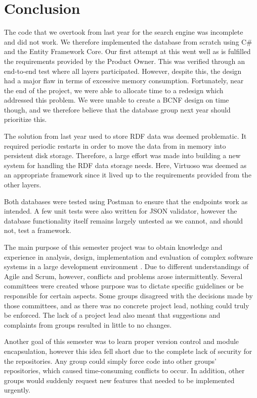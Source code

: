 \chapter{Conclusion}\label{ch:conclusion}
The code that we overtook from last year for the search engine was incomplete and did not work.
We therefore implemented the database from scratch using C\# and the Entity Framework Core.
Our first attempt at this went well as is fulfilled the requirements provided by the Product Owner. 
This was verified through an end-to-end test where all \knox{} layers participated.
However, despite this, the design had a major flaw in terms of excessive memory consumption. 
Fortunately, near the end of the project, we were able to allocate time to a redesign which addressed this problem.
We were unable to create a BCNF design on time though, and we therefore believe that the database group next year should prioritize this.

The solution from last year used to store RDF data was deemed problematic.
It required periodic restarts in order to move the data from in memory into persistent disk storage.
Therefore, a large effort was made into building a new system for handling the \knox{} RDF data storage needs. 
Here, Virtuoso was deemed as an appropriate framework since it lived up to the requirements provided from the other layers. 

Both databases were tested using Postman to ensure that the endpoints work as intended.
A few unit tests were also written for JSON validator, however the database functionality itself remains largely untested as we cannot, and should not, test a framework.

The main purpose of this semester project was to obtain knowledge and experience in analysis, design, implementation and evaluation of complex software systems in a large development environment \cite{AAULearningGoals5thSemester}.
Due to different understandings of Agile and Scrum, however, conflicts and problems arose intermittently.
Several committees were created whose purpose was to dictate specific guidelines or be responsible for certain aspects.
Some groups disagreed with the decisions made by those committees, and as there was no concrete project lead, nothing could truly be enforced. 
The lack of a project lead also meant that suggestions and complaints from groups resulted in little to no changes.


Another goal of this semester was to learn proper version control and module encapsulation, however this idea fell short due to the complete lack of security for the \knox{} repositories. 
Any group could simply force code into other groups' repositories, which caused time-consuming conflicts to occur.
In addition, other groups would suddenly request new features that needed to be implemented urgently.


